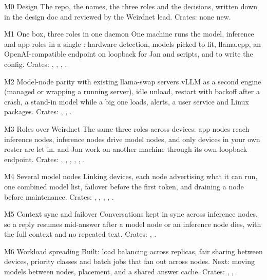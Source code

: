\begin{rowlist}
  \item[M0 Design \status{Done}] The repo, the names, the three roles and the decisions, written down in the design doc and reviewed by the Weirdnet lead. Crates: none new.
  \item[M1 One box, three roles in one daemon \status{Done}] One machine runs the model, inference and app roles in a single : hardware detection, models picked to fit, llama.cpp, an OpenAI-compatible endpoint on loopback for Jan and scripts, and  to write the config. Crates: , , , .
  \item[M2 Model-node parity with existing llama-swap servers \status{Done}] vLLM as a second engine (managed or wrapping a running server), idle unload, restart with backoff after a crash, a stand-in model while a big one loads, alerts, a user service and Linux packages. Crates: , , .
  \item[M3 Roles over Weirdnet \status{Done}] The same three roles across devices: app nodes reach inference nodes, inference nodes drive model nodes, and only devices in your own roster are let in.  and Jan work on another machine through its own loopback endpoint. Crates: , , , , , .
  \item[M4 Several model nodes \status{Done}] Linking devices, each node advertising what it can run, one combined model list, failover before the first token, and draining a node before maintenance. Crates: , , , , .
  \item[M5 Context sync and failover \status{Done}] Conversations kept in sync across inference nodes, so a reply resumes mid-answer after a model node or an inference node dies, with the full context and no repeated text. Crates: , .
  \item[M6 Workload spreading \status{In progress}] Built: load balancing across replicas, fair sharing between devices, priority classes and batch jobs that fan out across nodes. Next: moving models between nodes, placement, and a shared answer cache. Crates: , , .

\end{rowlist}
